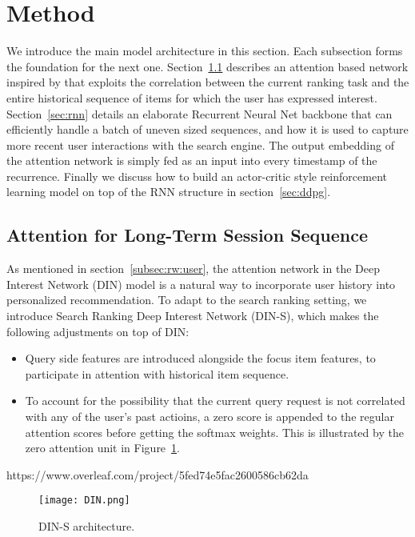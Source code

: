 \section{Method}
\label{sec:method}
We introduce the main model architecture in this section. Each subsection forms the foundation for the next one. Section~\ref{sec:din} describes an attention based network inspired by \cite{zhou2018deep} that exploits the correlation between the current ranking task and the entire historical sequence of items for which the user has expressed interest. Section~\ref{sec:rnn} details an elaborate Recurrent Neural Net backbone that can efficiently handle a batch of uneven sized sequences, and how it is used to capture more recent user interactions with the search engine. The output embedding of the attention network is simply fed as an input into every timestamp of the recurrence. Finally we discuss how to build an actor-critic style reinforcement learning model on top of the RNN structure in section~\ref{sec:ddpg}. 

\subsection{Attention for Long-Term Session Sequence}
\label{sec:din}
As mentioned in section~\ref{subsec:rw:user}, the attention network in the Deep Interest Network (DIN) model is a natural way to incorporate user history into personalized recommendation. To adapt to the search ranking setting, we introduce Search Ranking Deep Interest Network (DIN-S), which makes the following adjustments on top of DIN:
\begin{itemize}
    \item Query side features are introduced alongside the focus item features, to participate in attention with historical item sequence.
    \item To account for the possibility that the current query request is not correlated with any of the user's past actioins, a zero score is appended to the regular attention scores before getting the softmax weights. This is illustrated by the zero attention unit in Figure~\ref{fig:din}.
\end{itemize}https://www.overleaf.com/project/5fed74e5fac2600586cb62da
\begin{figure}
    \centering
    \texttt{[image: DIN.png]}
    \centering
    \caption{DIN-S architecture.}
    \label{fig:din}
\vspace{-5pt}
\end{figure}


